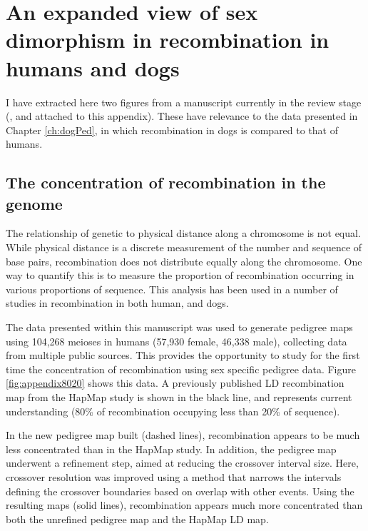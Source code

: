
\beginappendixA

\section{An expanded view of sex dimorphism in recombination in humans and dogs}

I have extracted here two figures from a manuscript currently in the review stage (\citet{Bherer2016}, and attached to this appendix).
These have relevance to the data presented in Chapter \ref{ch:dogPed}, in which recombination in dogs is compared to that of humans.


\subsection{The concentration of recombination in the genome}
The relationship of genetic to physical distance along a chromosome is not equal.
While physical distance is a discrete measurement of the number and sequence of base pairs, recombination does not distribute equally along the chromosome.
One way to quantify this is to measure the proportion of recombination occurring in various proportions of sequence.
This analysis has been used in a number of studies in recombination in both human\cite{Myers2005,hapmap2007}, and dogs\cite{Auton2013}.

The data presented within this manuscript was used to generate pedigree maps using 104,268 meioses in humans (57,930 female, 46,338 male), collecting data from multiple public sources.
This provides the opportunity to study for the first time the concentration of recombination using sex specific pedigree data.
Figure \ref{fig:appendix8020} shows this data.
A previously published LD recombination map from the HapMap\cite{hapmap2007} study is shown in the black line, and represents current understanding (80\% of recombination occupying less than 20\% of sequence).

In the new pedigree map built (dashed lines), recombination appears to be much less concentrated than in the HapMap study.
In addition, the pedigree map underwent a refinement step, aimed at reducing the crossover interval size.
Here, crossover resolution was improved using a method that narrows the intervals defining the crossover boundaries based on overlap with other events.
Using the resulting maps (solid lines), recombination appears much more concentrated than both the unrefined pedigree map and the HapMap LD map.

